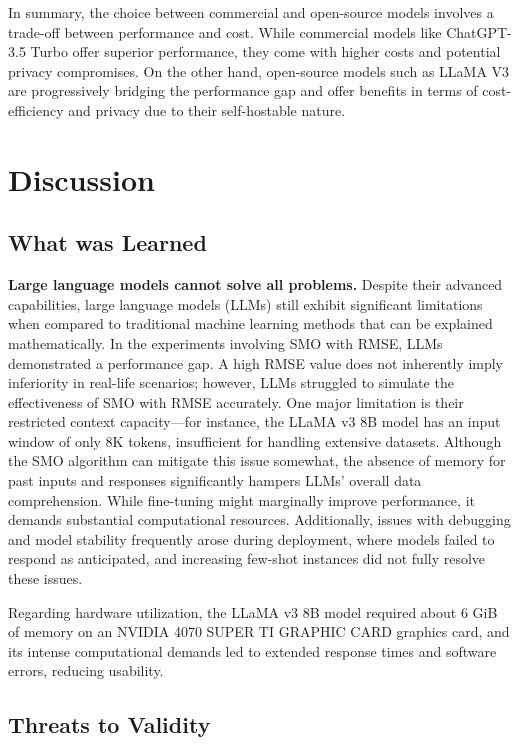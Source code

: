 \documentclass{ieeeaccess}
\begin{document}
In summary, the choice between commercial and open-source models involves a trade-off between performance and cost. While commercial models like ChatGPT-3.5 Turbo offer superior performance, they come with higher costs and potential privacy compromises. On the other hand, open-source models such as LLaMA V3 are progressively bridging the performance gap and offer benefits in terms of cost-efficiency and privacy due to their self-hostable nature.

\section{Discussion}
\label{sec:discussion}

\subsection{What was Learned}

\textbf{Large language models cannot solve all problems.} Despite their advanced capabilities, large language models (LLMs) still exhibit significant limitations when compared to traditional machine learning methods that can be explained mathematically. In the experiments involving SMO with RMSE, LLMs demonstrated a performance gap. A high RMSE value does not inherently imply inferiority in real-life scenarios; however, LLMs struggled to simulate the effectiveness of SMO with RMSE accurately. One major limitation is their restricted context capacity—for instance, the LLaMA v3 8B model has an input window of only 8K tokens, insufficient for handling extensive datasets. Although the SMO algorithm can mitigate this issue somewhat, the absence of memory for past inputs and responses significantly hampers LLMs' overall data comprehension. While fine-tuning might marginally improve performance, it demands substantial computational resources. Additionally, issues with debugging and model stability frequently arose during deployment, where models failed to respond as anticipated, and increasing few-shot instances did not fully resolve these issues.

Regarding hardware utilization, the LLaMA v3 8B model required about 6 GiB of memory on an NVIDIA 4070 SUPER TI GRAPHIC CARD graphics card, and its intense computational demands led to extended response times and software errors, reducing usability.

\subsection{Threats to Validity}
\end{document}
